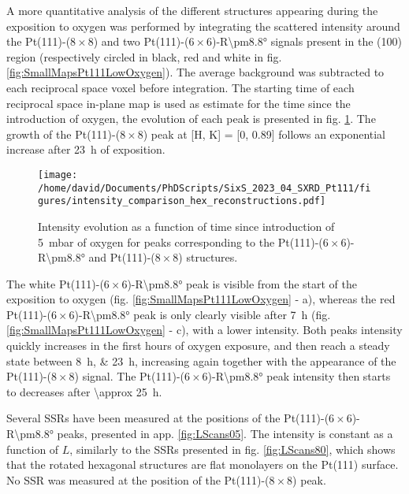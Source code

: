 A more quantitative analysis of the different structures appearing during the exposition to oxygen was performed by integrating the scattered intensity around the Pt(111)-($8\times8$) and two Pt(111)-($6\times6$)-R\ang{\pm8.8} signals present in the (100) region (respectively circled in black, red and white in fig. \ref{fig:SmallMapsPt111LowOxygen}).
The average background was subtracted to each reciprocal space voxel before integration.
The starting time of each reciprocal space in-plane map is used as estimate for the time since the introduction of oxygen, the evolution of each peak is presented in fig. \ref{fig:HexBraggPeaks}.
The growth of the Pt(111)-($8\times8$) peak at [H, K] = [0, 0.89] follows an exponential increase after \qty{23}{\hour} of exposition.

\begin{figure}[!htb]
    \centering
    \texttt{[image: /home/david/Documents/PhDScripts/SixS\_2023\_04\_SXRD\_Pt111/figures/intensity\_comparison\_hex\_reconstructions.pdf]}
    \caption{
        Intensity evolution as a function of time since introduction of \qty{5}{\milli\bar} of oxygen for peaks corresponding to the Pt(111)-($6\times6$)-R\ang{\pm8.8} and Pt(111)-($8\times8$) structures.
    }
    \label{fig:HexBraggPeaks}
\end{figure}

The white Pt(111)-($6\times6$)-R\ang{\pm8.8} peak is visible from the start of the exposition to oxygen (fig. \ref{fig:SmallMapsPt111LowOxygen} - a), whereas the red Pt(111)-($6\times6$)-R\ang{\pm8.8} peak is only clearly visible after \qty{7}{\hour} (fig. \ref{fig:SmallMapsPt111LowOxygen} - c), with a lower intensity.
Both peaks intensity quickly increases in the first hours of oxygen exposure, and then reach a steady state between \qtylist{8;23}{\hour}, increasing again together with the appearance of the Pt(111)-($8\times8$) signal.
The Pt(111)-($6\times6$)-R\ang{\pm8.8} peak intensity then starts to decreases after \qty{\approx 25}{\hour}.

Several SSRs have been measured at the positions of the Pt(111)-($6\times6$)-R\ang{\pm8.8} peaks, presented in app. \ref{fig:LScans05}.
The intensity is constant as a function of $L$, similarly to the SSRs presented in fig. \ref{fig:LScans80}, which shows that the rotated hexagonal structures are flat monolayers on the Pt(111) surface.
No SSR was measured at the position of the Pt(111)-($8\times8$) peak.

